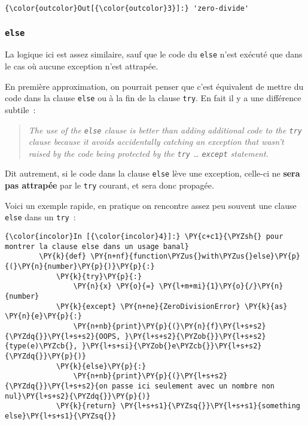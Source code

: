 \begin{Verbatim}[commandchars=\\\{\}]
{\color{outcolor}Out[{\color{outcolor}3}]:} 'zero-divide'
\end{Verbatim}
            
    \hypertarget{else}{%
\subsubsection{\texorpdfstring{\texttt{else}}{else}}\label{else}}

    La logique ici est assez similaire, sauf que le code du \texttt{else}
n'est exécuté que dans le cas où aucune exception n'est attrapée.

    En première approximation, on pourrait penser que c'est équivalent de
mettre du code dans la clause \texttt{else} ou à la fin de la clause
\texttt{try}. En fait il y a une différence subtile~:

\begin{quote}
\emph{The use of the \texttt{else} clause is better than adding
additional code to the \texttt{try} clause because it avoids
accidentally catching an exception that wasn't raised by the code being
protected by the \texttt{try} \ldots{} \texttt{except} statement.}
\end{quote}

Dit autrement, si le code dans la clause \texttt{else} lève une
exception, celle-ci ne \textbf{sera pas attrapée} par le \texttt{try}
courant, et sera donc propagée.

    Voici un exemple rapide, en pratique on rencontre assez peu souvent une
clause \texttt{else} dans un \texttt{try}~:

    \begin{Verbatim}[commandchars=\\\{\}]
{\color{incolor}In [{\color{incolor}4}]:} \PY{c+c1}{\PYZsh{} pour montrer la clause else dans un usage banal}
        \PY{k}{def} \PY{n+nf}{function\PYZus{}with\PYZus{}else}\PY{p}{(}\PY{n}{number}\PY{p}{)}\PY{p}{:}
            \PY{k}{try}\PY{p}{:}
                \PY{n}{x} \PY{o}{=} \PY{l+m+mi}{1}\PY{o}{/}\PY{n}{number}
            \PY{k}{except} \PY{n+ne}{ZeroDivisionError} \PY{k}{as} \PY{n}{e}\PY{p}{:}
                \PY{n+nb}{print}\PY{p}{(}\PY{n}{f}\PY{l+s+s2}{\PYZdq{}}\PY{l+s+s2}{OOPS, }\PY{l+s+s2}{\PYZob{}}\PY{l+s+s2}{type(e)\PYZcb{}, }\PY{l+s+si}{\PYZob{}e\PYZcb{}}\PY{l+s+s2}{\PYZdq{}}\PY{p}{)}
            \PY{k}{else}\PY{p}{:}
                \PY{n+nb}{print}\PY{p}{(}\PY{l+s+s2}{\PYZdq{}}\PY{l+s+s2}{on passe ici seulement avec un nombre non nul}\PY{l+s+s2}{\PYZdq{}}\PY{p}{)}
            \PY{k}{return} \PY{l+s+s1}{\PYZsq{}}\PY{l+s+s1}{something else}\PY{l+s+s1}{\PYZsq{}}
\end{Verbatim}


